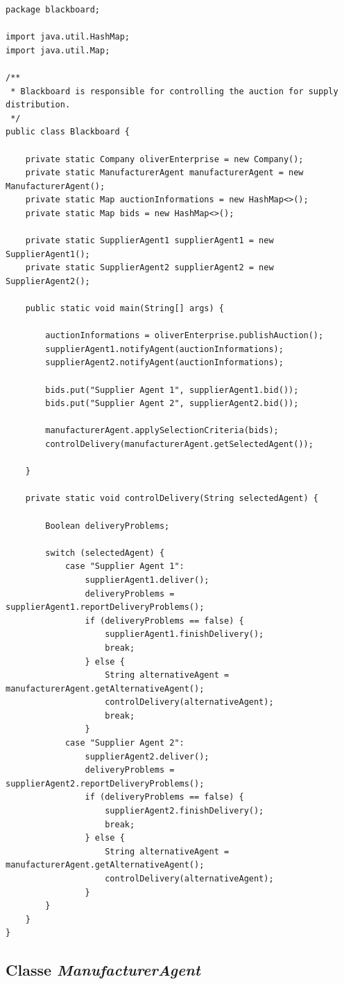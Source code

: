 \begin{lstlisting}
package blackboard;

import java.util.HashMap;
import java.util.Map;

/**
 * Blackboard is responsible for controlling the auction for supply distribution.  
 */
public class Blackboard {

	private static Company oliverEnterprise = new Company();
	private static ManufacturerAgent manufacturerAgent = new ManufacturerAgent();
	private static Map auctionInformations = new HashMap<>();
	private static Map bids = new HashMap<>();
	
	private static SupplierAgent1 supplierAgent1 = new SupplierAgent1();
	private static SupplierAgent2 supplierAgent2 = new SupplierAgent2();
	
	public static void main(String[] args) {
		
		auctionInformations = oliverEnterprise.publishAuction();
		supplierAgent1.notifyAgent(auctionInformations);
		supplierAgent2.notifyAgent(auctionInformations);
		
		bids.put("Supplier Agent 1", supplierAgent1.bid());
		bids.put("Supplier Agent 2", supplierAgent2.bid());
		
		manufacturerAgent.applySelectionCriteria(bids);
		controlDelivery(manufacturerAgent.getSelectedAgent());

	}
	
	private static void controlDelivery(String selectedAgent) {
		
		Boolean deliveryProblems;
		
		switch (selectedAgent) {
			case "Supplier Agent 1":
				supplierAgent1.deliver();
				deliveryProblems = supplierAgent1.reportDeliveryProblems();
				if (deliveryProblems == false) {
					supplierAgent1.finishDelivery();
					break;
				} else {
					String alternativeAgent = manufacturerAgent.getAlternativeAgent();
					controlDelivery(alternativeAgent);
					break;
				}
			case "Supplier Agent 2":
				supplierAgent2.deliver();
				deliveryProblems = supplierAgent2.reportDeliveryProblems();
				if (deliveryProblems == false) {
					supplierAgent2.finishDelivery();
					break;
				} else {
					String alternativeAgent = manufacturerAgent.getAlternativeAgent();
					controlDelivery(alternativeAgent);
				}
		}
	}
}

\end{lstlisting}

\subsection{Classe \textit{ManufacturerAgent}}


